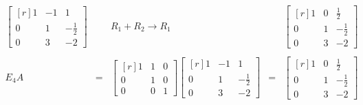 \begin{enumerate}
    $$\begin{array}{rcccc}
	\begin{bmatrix*}[r]
	    1 & -1 & 1\\
	    0 & 1 & -\frac{1}{2}\\
	    0 & 3 & -2
	\end{bmatrix*} && R_1+R_2\to R_1 & &
	\begin{bmatrix*}[r]
	    1 & 0 & \frac{1}{2}\\
	    0 & 1 & -\frac{1}{2}\\
	    0 & 3 & -2
	\end{bmatrix*} \\\\
	E_4A&=&\begin{bmatrix*}[r]
	    1 & 1 & 0\\
	    0 & 1 & 0\\
	    0 & 0 & 1
	\end{bmatrix*} 
	\begin{bmatrix*}[r]
	    1 & -1 & 1\\
	    0 & 1 & -\frac{1}{2}\\
	    0 & 3 & -2
	\end{bmatrix*} &=& 
	\begin{bmatrix*}[r]
	    1 & 0 & \frac{1}{2}\\
	    0 & 1 & -\frac{1}{2}\\
	    0 & 3 & -2
	\end{bmatrix*} \\\\
    \end{array}$$


\end{enumerate}
